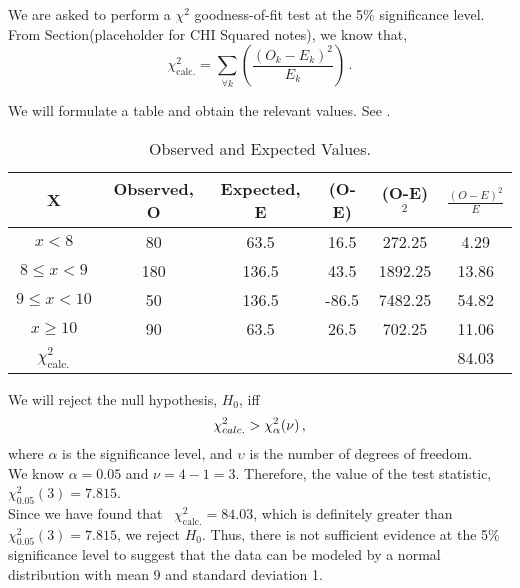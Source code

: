 \begin{subquestions}
\begin{subsubquestions}
We are asked to perform a $\chi^2$ goodness-of-fit test at the 5\% significance level. From Section(placeholder for CHI Squared notes), we know that,
\begin{equation}
	\chi^2_{\text{calc.}} = \sum_{\forall k} \left( \frac{(O_k-E_k)^2}{E_k}\right) \,.
\end{equation}

We will formulate a table and obtain the relevant values. See .
\begin{table}[H]
	\centering
	\begin{tabular}{|c|c|c|c|c|c|}
		\hline 
		X & Observed, O & Expected, E & (O-E) & (O-E)$^2$ & $\frac{(O-E)^2}{E}$ \\
		\hline
		$x<8$ & 80 & 63.5 & 16.5 & 272.25 & 4.29 \\
		$8 \leq x < 9$ & 180 & 136.5 & 43.5 & 1892.25 & 13.86 \\
		$9 \leq x < 10$ & 50 & 136.5 & -86.5 & 7482.25 & 54.82 \\
		$x \geq 10$ & 90 & 63.5 & 26.5 & 702.25 & 11.06 \\
		\hline
		$\chi^2_{\text{calc.}}$ & & & & & 84.03 \\
		\hline
	\end{tabular}
	\caption{\label{2015:q4:tab:Chi} Observed and Expected Values.}
\end{table}

We will reject the null hypothesis, $H_0$, iff 
\begin{align}
	\chi^2_{calc.} > \chi^2_{\alpha} (\nu) \,, \nonumber 
\end{align}
where $\alpha$ is the significance level, and $\upsilon$ is the number of degrees of freedom. \\

We know $\alpha= 0.05$ and $\nu = 4-1=3$. Therefore, the value of the test statistic, $\chi^2_{0.05}(3)=7.815$. \\

Since we have found that ~$\chi^2_{\text{calc.}} = 84.03$, which is definitely greater than ~$\chi^2_{0.05}(3)=7.815$, we reject $H_0$. Thus, there is not sufficient evidence at the 5\% significance level to suggest that the data can be modeled by a normal distribution with mean 9 and standard deviation 1.

\end{subsubquestions}

\end{subquestions}

